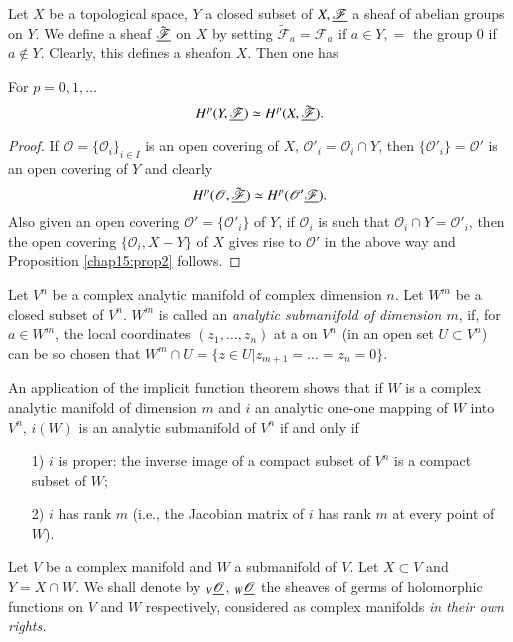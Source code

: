 Let $X$ be a topological space, $Y$ a closed subset of $X,
\underline{\mathscr{F}}$ a sheaf of abelian groups on $Y$. We define a sheaf
$\tilde{\underline{\mathscr{F}}}$ on $X$ by setting $\tilde{\mathscr{F}}_a =
\mathscr{F}_a$ if $a \in Y, = $ the group 0 if $a \not\in Y$. Clearly,
this defines a  sheaf\pageoriginale on $X$. Then one has 

\begin{proposition}\label{chap15:prop2}
For $p=0,1, \ldots$
$$
H^p (Y, \underline{\mathscr{F}}) \simeq H^p (X, \tilde{\underline{\mathscr{F}}}). 
$$
\end{proposition}

\begin{proof}
If $\mathscr{O} = \{\mathscr{O}_i\}_{i \in I}$ is an open covering of
$X$, $\mathscr{O}'_i = \mathscr{O}_i \cap Y$, then $\{\mathscr{O}'_i\}
= \mathscr{O}'$ is an open covering of $Y$ and clearly
$$
H^p (\mathscr{O}, \tilde{\underline{\mathscr{F}}}) \simeq H^p (\mathscr{O}'
\underline{\mathscr{F}}). 
$$
Also given an open covering $\mathscr{O}' = \{\mathscr{O}'_i\}$ of
$Y$, if $\mathscr{O}_i$ is such that $\mathscr{O}_i\cap Y =
\mathscr{O}'_i$, then the open covering $\{\mathscr{O}_i, X - Y\}$ of
$X$ gives rise to $\mathscr{O}'$ in the above way and Proposition
\ref{chap15:prop2} follows. 
\end{proof}

\begin{defi*}
Let $V^n$ be a complex analytic manifold of complex dimension $n$. Let
$W^m$ be a closed subset of $V^n$. $W^m$ is called an 
\textit{analytic submanifold of dimension $m$}, if, for $a \in W^m$,
the local coordinates $(z_1, \ldots, z_n)$ at a on $V^n$ (in an open
set $U \subset V^n$) can be so chosen that $W^m \cap U = \{z \in U
\big| z_{m+1} = \ldots = z_n = 0\}$. 
\end{defi*}

An application of the implicit function theorem shows that if $W$ is a
complex analytic manifold of dimension $m$ and $i$ an analytic one-one
mapping of $W$ into $V^n$, $i(W)$ is an analytic submanifold of $V^n$
if and only if 
\begin{itemize}
\item[1)] $i$ is proper: the inverse image of a compact subset of
  $V^n$ is a  compact subset of $W$; 

\item[2)] $i$ has rank $m$ (i.e., the Jacobian matrix of $i$ has rank
  $m$ at every point of $W$).
\end{itemize}

Let $V$ be a complex manifold and $W$ a submanifold of $V$. Let $X
\subset V$ and $Y = X \cap W$. We shall denote by ${}_V
\underline{\mathscr{O}}$, ${}_W \underline{\mathscr{O}}$ the sheaves of germs of
holomorphic functions on $V$ and $W$ respectively, considered as
complex manifolds \textit{in their own rights.}

